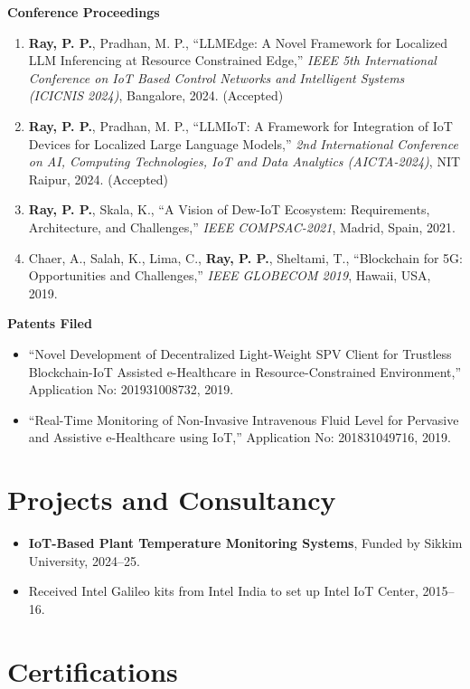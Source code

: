 \documentclass[10pt,a4paper]{article}
\begin{document}
	\textbf{Conference Proceedings}
	\begin{enumerate}[leftmargin=0.2in]
		\item \textbf{Ray, P. P.}, Pradhan, M. P., “LLMEdge: A Novel Framework for Localized LLM Inferencing at Resource Constrained Edge,” \textit{IEEE 5th International Conference on IoT Based Control Networks and Intelligent Systems (ICICNIS 2024)}, Bangalore, 2024. (Accepted)
		\item \textbf{Ray, P. P.}, Pradhan, M. P., “LLMIoT: A Framework for Integration of IoT Devices for Localized Large Language Models,” \textit{2nd International Conference on AI, Computing Technologies, IoT and Data Analytics (AICTA-2024)}, NIT Raipur, 2024. (Accepted)
		\item \textbf{Ray, P. P.}, Skala, K., “A Vision of Dew-IoT Ecosystem: Requirements, Architecture, and Challenges,” \textit{IEEE COMPSAC-2021}, Madrid, Spain, 2021.
		\item Chaer, A., Salah, K., Lima, C., \textbf{Ray, P. P.}, Sheltami, T., “Blockchain for 5G: Opportunities and Challenges,” \textit{IEEE GLOBECOM 2019}, Hawaii, USA, 2019.
	\end{enumerate}
	
	\textbf{Patents Filed}
	\begin{itemize}[leftmargin=0.15in]
		\item “Novel Development of Decentralized Light-Weight SPV Client for Trustless Blockchain-IoT Assisted e-Healthcare in Resource-Constrained Environment,” Application No: 201931008732, 2019.
		\item “Real-Time Monitoring of Non-Invasive Intravenous Fluid Level for Pervasive and Assistive e-Healthcare using IoT,” Application No: 201831049716, 2019.
	\end{itemize}
	
	\section*{Projects and Consultancy}
	
	\begin{itemize}[leftmargin=0.15in]
		\item \textbf{IoT-Based Plant Temperature Monitoring Systems}, Funded by Sikkim University, 2024--25.
		\item Received Intel Galileo kits from Intel India to set up Intel IoT Center, 2015--16.
	\end{itemize}
	
	\section*{Certifications}
	
\end{document}
